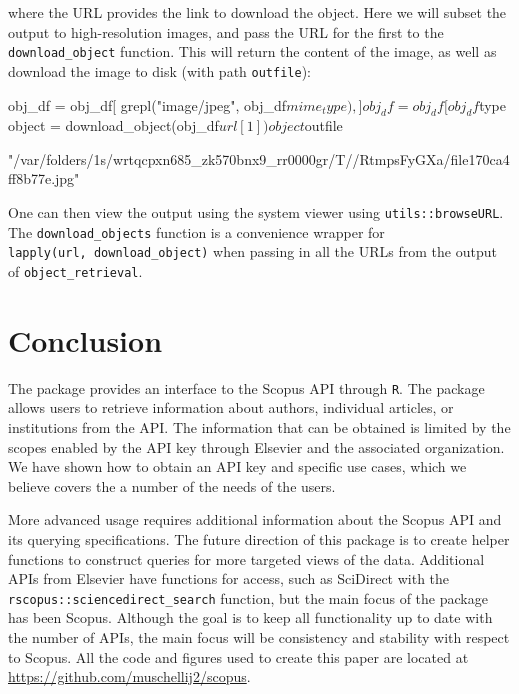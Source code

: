where the URL provides the link to download the object. Here we will
subset the output to high-resolution images, and pass the URL for the
first to the \texttt{download\_object} function. This will return the
content of the image, as well as download the image to disk (with path
\texttt{outfile}):

\begin{Schunk}
\begin{Sinput}
obj_df = obj_df[ grepl("image/jpeg", obj_df$mime_type),]
obj_df = obj_df[ obj_df$type %in% "IMAGE-HIGH-RES",]
object = download_object(obj_df$url[1])
object$outfile
\end{Sinput}
\begin{Soutput}
[1] "/var/folders/1s/wrtqcpxn685_zk570bnx9_rr0000gr/T//RtmpsFyGXa/file170ca4ff8b77e.jpg"
\end{Soutput}
\end{Schunk}

One can then view the output using the system viewer using
\texttt{utils::browseURL}. The \texttt{download\_objects} function is a
convenience wrapper for \texttt{lapply(url,\ download\_object)} when
passing in all the URLs from the output of \texttt{object\_retrieval}.

\hypertarget{conclusion}{%
\section{Conclusion}\label{conclusion}}

The  package provides an interface to the Scopus API
through \texttt{R}. The package allows users to retrieve information
about authors, individual articles, or institutions from the API. The
information that can be obtained is limited by the scopes enabled by the
API key through Elsevier and the associated organization. We have shown
how to obtain an API key and specific use cases, which we believe covers
the a number of the needs of the users.

More advanced usage requires additional information about the Scopus API
and its querying specifications. The future direction of this package is
to create helper functions to construct queries for more targeted views
of the data. Additional APIs from Elsevier have functions for access,
such as SciDirect with the \texttt{rscopus::sciencedirect\_search}
function, but the main focus of the package has been Scopus. Although
the goal is to keep all functionality up to date with the number of
APIs, the main focus will be consistency and stability with respect to
Scopus. All the code and figures used to create this paper are located
at \url{https://github.com/muschellij2/scopus}.

